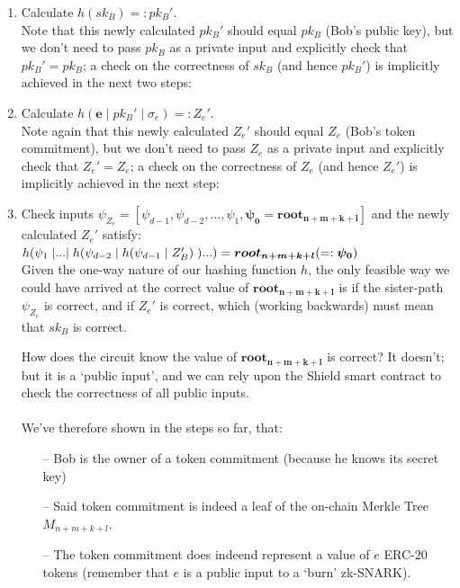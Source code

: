 \documentclass{article}
\DeclarePairedDelimiter\br{(}{)}
\begin{document}
\begin{enumerate}
  \item Calculate $h(sk_B) =: pk_B'$.\\
    Note that this newly calculated $pk_B'$ should equal $pk_B$ (Bob's public key), but we don't need to pass $pk_B$ as a private input and explicitly check that $pk_B'=pk_B$; a check on the correctness of $sk_B$ (and hence $pk_B'$) is implicitly achieved in the next two steps:
  \item Calculate $h(\bm{e}\;|\;pk_B'\;|\;\sigma_e) =: Z_e'$.\\
    Note again that this newly calculated $Z_e'$ should equal $Z_e$ (Bob's token commitment), but we don't need to pass $Z_e$ as a private input and explicitly check that $Z_e'=Z_e$; a check on the correctness of $Z_e$ (and hence $Z_e'$) is implicitly achieved in the next step:
  \item Check inputs $\psi_{Z_e}=[\psi_{d-1}, \psi_{d-2},..., \psi_{1}, \bm{\psi_{0}=root_{n+m+k+l}}]$ and the newly calculated $Z_e'$ satisfy:\\
    $h\br*{\psi_{1}\;|...|\;h\br*{\psi_{d-2}\;|\;h\br*{\psi_{d-1}\;|\;Z_B'}\;}...} = \bm{root_{n+m+k+l}} ( =: \bm{\psi_{0}})$\\
    Given the one-way nature of our hashing function $h$, the only feasible way we could have arrived at the correct value of $\bm{root_{n+m+k+l}}$ is if the sister-path $\psi_{Z_e}$ is correct, and if $Z_e'$ is correct, which (working backwards) must mean that $sk_B$ is correct.

    How does the circuit know the value of $\bm{root_{n+m+k+l}}$ is correct? It doesn't; but it is a `public input', and we can rely upon the Shield smart contract to check the correctness of all public inputs.\\
  \\
  We've therefore shown in the steps so far, that:
  \begin{itemize}
    \item[--] Bob is the owner of a token commitment (because he knows its secret key)
    \item[--] Said token commitment is indeed a leaf of the on-chain Merkle Tree $M_{n+m+k+l}$.
    \item[--] The token commitment does indeend represent a value of $e$ ERC-20 tokens (remember that $e$ is a public input to a `burn' zk-SNARK).
  \end{itemize}


\end{enumerate}
\end{document}
